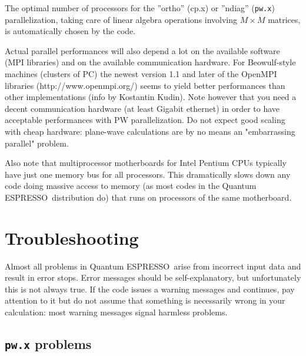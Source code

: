 \documentclass[12pt,a4paper]{article}
\def\qe{{\sc Quantum ESPRESSO}}
\def\pw.x{\texttt{pw.x}}
\begin{document}
The optimal number of processors for the ''ortho'' (cp.x) or ''ndiag'' 
(\pw.x) parallelization, taking care of linear algebra operations 
involving $M\times M$ matrices, is automatically chosen by the code.

Actual parallel performances will also depend a lot on the available software 
(MPI libraries) and on the available communication hardware. For
Beowulf-style machines (clusters of PC) the newest version 1.1 and later of 
the OpenMPI libraries (http://www.openmpi.org/) seems to yield better 
performances than other implementations (info by Kostantin Kudin). 
Note however that you need a decent communication hardware (at least 
Gigabit ethernet) in order to have acceptable performances with 
PW parallelization. Do not expect good scaling with cheap hardware: 
plane-wave calculations are by no means an "embarrassing parallel" problem.
   
Also note that multiprocessor motherboards for Intel Pentium CPUs typically 
have just one memory bus for all processors. This dramatically
slows down any code doing massive access to memory (as most codes 
in the \qe\ distribution do) that runs on processors of the same
motherboard.

\section{Troubleshooting}

Almost all problems in \qe\ arise from incorrect input data 
and result in
error stops. Error messages should be self-explanatory, but unfortunately
this is not always true. If the code issues a warning messages and continues,
pay attention to it but do not assume that something is necessarily wrong in
your calculation: most warning messages signal harmless problems.

\subsection{\pw.x problems}
\end{document}
